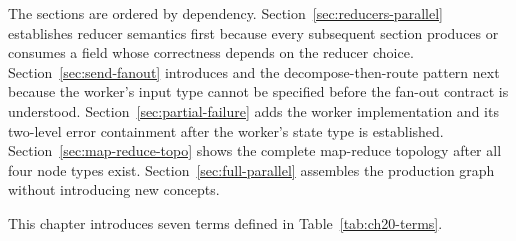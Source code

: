 The sections are ordered by dependency.
Section~\ref{sec:reducers-parallel} establishes reducer semantics first
because every subsequent section produces or consumes a field whose
correctness depends on the reducer choice.
Section~\ref{sec:send-fanout} introduces  and the
decompose-then-route pattern next because the worker's input type cannot
be specified before the fan-out contract is understood.
Section~\ref{sec:partial-failure} adds the worker implementation and its
two-level error containment after the worker's state type is established.
Section~\ref{sec:map-reduce-topo} shows the complete map-reduce topology
after all four node types exist.
Section~\ref{sec:full-parallel} assembles the production graph without
introducing new concepts.

This chapter introduces seven terms defined in Table~\ref{tab:ch20-terms}.

